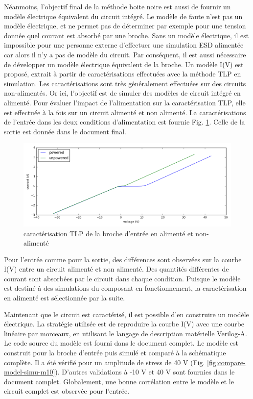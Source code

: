 Néanmoins, l'objectif final de la méthode boite noire est aussi de fournir un modèle électrique équivalent du circuit intégré.
Le modèle de faute n'est pas un modèle électrique, et ne permet pas de déterminer par exemple pour une tension donnée quel courant est absorbé par une broche.
Sans un modèle électrique, il est impossible pour une personne externe d'effectuer une simulation ESD alimentée car alors il n'y a pas de modèle du circuit.
Par conséquent, il est aussi nécessaire de développer un modèle électrique équivalent de la broche.
Un modèle I(V) est proposé, extrait à partir de caractérisations effectuées avec la méthode TLP en simulation.
Les caractérisations sont très généralement effectuées sur des circuits non-alimentés.
Or ici, l'objectif est de simuler des modèles de circuit intégré en alimenté.
Pour évaluer l'impact de l'alimentation sur la caractérisation TLP, elle est effectuée à la fois sur un circuit alimenté et non alimenté.
La caractérisations de l'entrée dans les deux conditions d'alimentation est fournie Fig. \ref{fig:tlp-input-cz}.
Celle de la sortie est donnée dans le document final.

\begin{figure}[!h]
  \centering
  \includegraphics[width=\textwidth]{src/1/figures/tlp_input_characterization.png}
  \caption{caractérisation TLP de la broche d'entrée en alimenté et non-alimenté}
  \label{fig:tlp-input-cz}
\end{figure}

Pour l'entrée comme pour la sortie, des différences sont observées sur la courbe I(V) entre un circuit alimenté et non alimenté.
Des quantités différentes de courant sont absorbées par le circuit dans chaque condition.
Puisque le modèle est destiné à des simulations du composant en fonctionnement, la caractérisation en alimenté est sélectionnée par la suite.

Maintenant que le circuit est caractérisé, il est possible d'en construire un modèle électrique.
La stratégie utilisée est de reproduire la courbe I(V) avec une courbe linéaire par morceaux, en utilisant le langage de description matérielle Verilog-A.
Le code source du modèle est fourni dans le document complet.
Le modèle est construit pour la broche d'entrée puis simulé et comparé à la schématique complète.
Il a été vérifié pour un amplitude de stress de 40 V (Fig. \ref{fig:compare-model-simu-m10}).
D'autres validations à -10 V et 40 V sont fournies dans le document complet.
Globalement, une bonne corrélation entre le modèle et le circuit complet est observée pour l'entrée.

